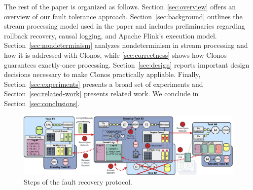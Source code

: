 \documentclass[sigconf]{acmart}
\begin{document}
The rest of the paper is organized as follows.
Section~\ref{sec:overview} offers an  overview of our fault tolerance approach.
Section~\ref{sec:background} outlines the stream processing model used in the paper and includes preliminaries regarding rollback recovery, causal logging, and Apache Flink's execution model.
Section~\ref{sec:nondeterminism} analyzes nondeterminism in stream processing and how it is addressed with Clonos, while \autoref{sec:correctness} shows how Clonos guarantees exactly-once processing.
Section~\ref{sec:design} reports important design decisions necessary to make Clonos practically appliable.
Finally, Section~\ref{sec:experiments} presents a broad set of experiments and Section~\ref{sec:related-work} 
presents related work. We conclude in Section~\ref{sec:conclusions}.


\begin{figure}[!t]
\centering
\includegraphics[width=.95\textwidth]{Figures/recovery.pdf}
\vspace{-2mm}
\caption{Steps of the fault recovery protocol.}
\label{fig:recovery-protocol}
\end{figure}
\end{document}
